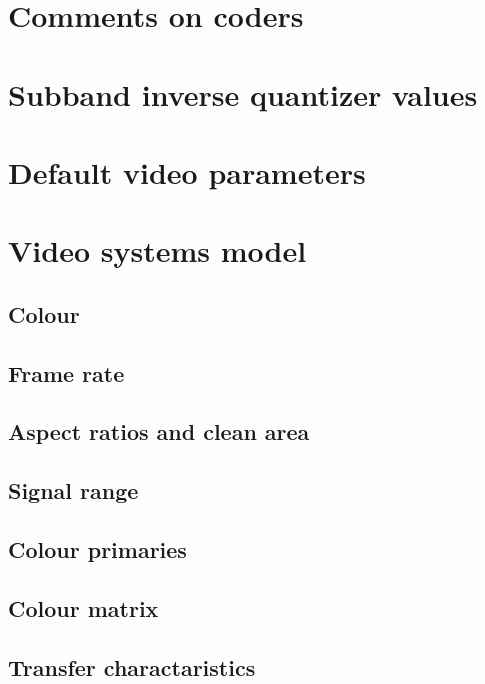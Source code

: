 \section{Comments on coders}
\section{Subband inverse quantizer values}
\clearpage
\section{Default video parameters}

\clearpage
\section{Video systems model}
\subsection{Colour}
\subsection{Frame rate}
\subsection{Aspect ratios and clean area}
\subsection{Signal range}
\subsection{Colour primaries}
\subsection{Colour matrix}
\subsection{Transfer charactaristics}


